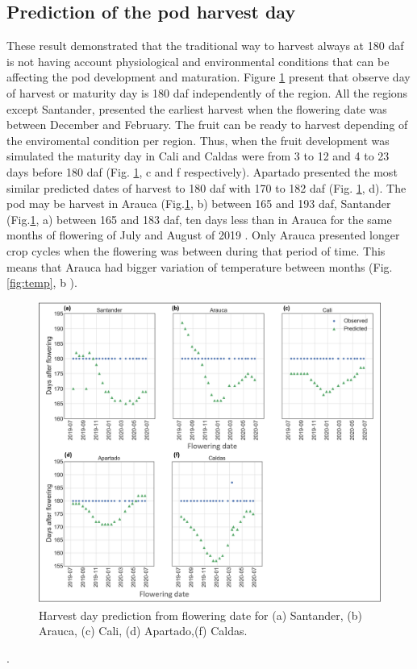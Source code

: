 \documentclass[gene,journal,article,submit,moreauthors,pdftex]{Definitions/mdpi}
\begin{document}
\subsection{Prediction of the pod harvest day }
These result demonstrated that the traditional way to harvest always at 180 daf is not having account physiological and environmental conditions that can be affecting the pod development and maturation.
Figure \ref{fig:dayH} present that observe day of harvest or maturity day is 180 daf independently of the region. All the regions except Santander, presented the earliest harvest when the flowering date was between December and February. The fruit can be ready to harvest depending of the enviromental condition per region. Thus, when the fruit development was simulated the maturity day in Cali and Caldas were from 3 to 12 and 4 to 23 days before 180 daf (Fig. \ref{fig:dayH}, c and f respectively). Apartado presented the most similar predicted dates of harvest to 180 daf with 170 to 182 daf  (Fig. \ref{fig:dayH}, d). The pod may be harvest in Arauca (Fig.\ref{fig:dayH}, b)  between 165 and 193 daf, Santander (Fig.\ref{fig:dayH}, a) between 165 and 183 daf, ten days less than in Arauca for the same months of flowering of July and August of 2019 . Only Arauca presented longer crop cycles when the flowering was between during that period of time. This means that Arauca had bigger variation of temperature between months (Fig. \ref{fig:temp}, b ).
 
\begin{figure}[h!]
	\centering
	\includegraphics[scale=0.4]{images/RegionHarvest2.png}
	\caption{\footnotesize {Harvest day prediction from flowering date for (a) Santander, (b) Arauca, (c) Cali, (d) Apartado,(f) Caldas. \\ }} 
	\label{fig:dayH}
\end{figure}.
\newpage
\end{document}

